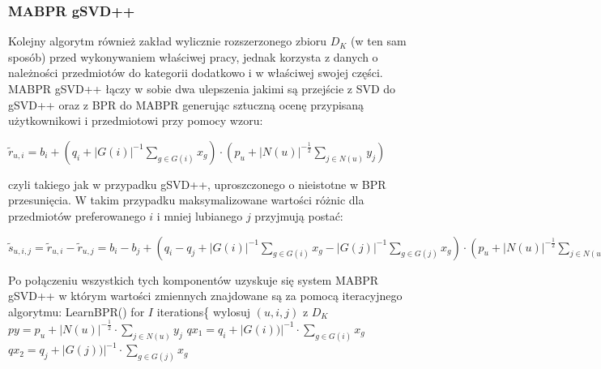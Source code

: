 \documentclass{pracamgr}
\begin{document}
    \subsubsection{MABPR gSVD++}
     Kolejny algorytm również zakład wylicznie rozszerzonego zbioru $D_K$ (w ten sam sposób) przed wykonywaniem właściwej pracy,
     jednak korzysta z danych o należności przedmiotów do kategorii dodatkowo i w właściwej swojej części.
     MABPR gSVD++ łączy w sobie dwa ulepszenia jakimi są przejście z SVD do gSVD++ oraz z BPR do MABPR generując sztuczną ocenę przypisaną
     użytkownikowi i przedmiotowi przy pomocy wzoru:
     \begin{center}
       $\tilde{r}_{u,i}=b_i+\left(q_i+|G(i)|^{-1}\sum\limits_{g\in G(i)}x_{g}\right)\cdot\left(p_u +|N(u)|^{-\frac{1}{2}}\sum\limits_{j\in N(u)}y_j\right)$
     \end{center}
     czyli takiego jak w przypadku gSVD++, uproszczonego o nieistotne w BPR przesunięcia.
     W takim przypadku maksymalizowane wartości różnic dla przedmiotów preferowanego $i$ i mniej lubianego $j$ przyjmują postać:
     \begin{center}
      $\tilde{s}_{u,i,j}=\tilde{r}_{u,i}-\tilde{r}_{u,j}=b_i-b_j+
      \left(q_i-q_j+|G(i)|^{-1}\sum\limits_{g\in G(i)}x_{g}-|G(j)|^{-1}\sum\limits_{g\in G(j)}x_{g}\right)
      \cdot\left(p_u +|N(u)|^{-\frac{1}{2}}\sum\limits_{j\in N(u)}y_j\right)$
     \end{center}
     Po połączeniu wszystkich tych komponentów uzyskuje się system MABPR gSVD++ w którym wartości zmiennych znajdowane są za pomocą iteracyjnego algorytmu:\newline
     \hspace*{16pt}	LearnBPR()\newline
     \hspace*{16pt}	for $I$ iterations\{\newline
     \hspace*{32pt}		wylosuj $(u,i,j)$ z $D_K$\newline 
     \hspace*{32pt}		$py=p_u +|N(u)|^{-\frac{1}{2}}\cdot\sum\limits_{j\in N(u)}y_j$\newline
     \hspace*{32pt}		$qx_1=q_i +|G(i))|^{-1}\cdot\sum\limits_{g\in G(i)}x_g$\newline
     \hspace*{32pt}		$qx_2=q_j +|G(j))|^{-1}\cdot\sum\limits_{g\in G(j)}x_g$\newline
\end{document}
